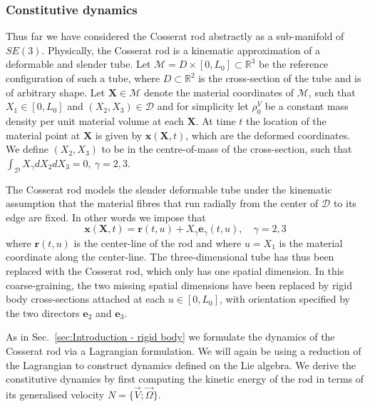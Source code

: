\subsubsection*{Constitutive dynamics} \label{sec:Cosserat rod constitutive dynamics}

Thus far we have considered the Cosserat rod abstractly as a sub-manifold of $SE(3)$. Physically, the Cosserat rod is a kinematic approximation of a deformable and slender tube. Let $\mathscr{M} = D \times [0, L_0] \subset \mathbb{R}^3$ be the reference configuration of such a tube, where $D \subset \mathbb{R}^2$ is the cross-section of the tube and is of arbitrary shape. Let $\mathbf{X} \in \mathscr{M}$ denote the material coordinates of $\mathscr{M}$, such that $X_1 \in [0, L_0]$ and $(X_2, X_3) \in \mathscr{D}$ and for simplicity let $\rho^V_0$ be a constant mass density per unit material volume at each $\mathbf{X}$. At time $t$ the location of the material point at $\mathbf{X}$ is given by $\mathbf{x}(\mathbf{X}, t)$, which are the deformed coordinates. We define $(X_2, X_3)$ to be in the centre-of-mass of the cross-section, such that $\int_{\mathscr{D}} X_\gamma d X_2 d X_3 = 0,\ \gamma = 2,3$.

The Cosserat rod models the slender deformable tube under the kinematic assumption that the material fibres that run radially from the center of $\mathcal{D}$ to its edge are fixed. In other words we impose that
\begin{equation} \label{eq:cosserat rod kinematic assumption}
\mathbf{x}(\mathbf{X}, t) = \mathbf{r}(t, u) + X_\gamma \mathbf{e}_\gamma(t, u), \quad \gamma = 2,3
\end{equation}
where $\mathbf{r}(t, u)$ is the center-line of the rod and where $u = X_1$ is the material coordinate along the center-line. The three-dimensional tube has thus been replaced with the Cosserat rod, which only has one spatial dimension. In this coarse-graining, the two missing spatial dimensions have been replaced by rigid body cross-sections attached at each $u \in [0, L_0]$, with orientation specified by the two directors $\mathbf{e}_2$ and $\mathbf{e}_3$.

As in Sec.~\ref{sec:Introduction - rigid body} we formulate the dynamics of the Cosserat rod via a Lagrangian formulation. We will again be using a reduction of the Lagrangian to construct dynamics defined on the Lie algebra. We derive the constitutive dynamics by first computing the kinetic energy of the rod in terms of its generalised velocity $N = \{ \vec{V} ; \vec{\Omega} \}$.

